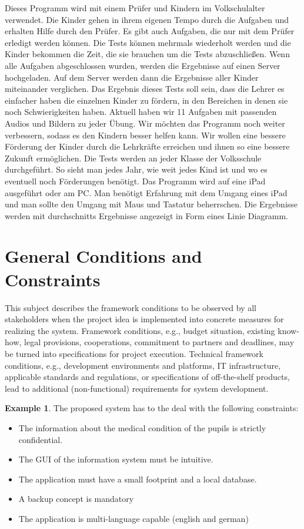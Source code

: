 \documentclass[12pt]{article}
\theoremstyle{definition}
\newtheorem{example}{Example}
\newenvironment{explanation}{%
   \setlength{\parindent}{0pt}
   \itshape
   \color{blue}
}{}
\begin{document}
Dieses Programm wird mit einem Prüfer und Kindern im Volkschulalter verwendet. Die Kinder gehen in ihrem eigenen Tempo durch die Aufgaben und erhalten Hilfe durch den Prüfer. Es gibt auch Aufgaben, die nur mit dem Prüfer erledigt werden können. Die Tests können mehrmals wiederholt werden und die Kinder bekommen die Zeit, die sie brauchen um die Tests abzuschließen. Wenn alle Aufgaben abgeschlossen wurden, werden die Ergebnisse auf einen Server hochgeladen. Auf dem Server werden dann die Ergebnisse aller Kinder miteinander verglichen.
Das Ergebnis dieses Tests soll sein, dass die Lehrer es einfacher haben die einzelnen Kinder zu fördern, in den Bereichen in denen sie noch Schwierigkeiten haben.
Aktuell haben wir 11 Aufgaben mit passenden Audios und Bildern zu jeder Übung.
Wir möchten das Programm noch weiter verbessern, sodass es den Kindern besser helfen kann.
Wir wollen eine bessere Förderung der Kinder durch die Lehrkräfte erreichen und ihnen so eine bessere Zukunft ermöglichen.
Die Tests werden an jeder Klasse der Volksschule durchgeführt. So sieht man jedes Jahr, wie weit jedes Kind ist und wo es eventuell noch Förderungen benötigt.
Das Programm wird auf eine iPad ausgeführt oder am PC. Man benötigt Erfahrung mit dem Umgang eines iPad und man sollte den Umgang mit Maus und Tastatur beherrschen.
Die Ergebnisse werden mit durchschnitts Ergebnisse angezeigt in Form eines Linie Diagramm.


\pagebreak

\section{General Conditions and Constraints}
\begin{explanation}
This subject describes the framework conditions to be observed by all stakeholders when the project idea is implemented into concrete measures for realizing the system. Framework conditions, e.g., budget situation, existing know-how, legal provisions, cooperations, commitment to partners and deadlines, may be turned into specifications for project execution.
Technical framework conditions, e.g., development environments and platforms, IT infrastructure, applicable standards and regulations, or specifications of off-the-shelf products, lead to additional (non-functional) requirements for system development.
\end{explanation}

\begin{example}
The proposed system has to the deal with the following constraints:
\begin{itemize}
\item The information about the medical condition of the pupils is strictly confidential.
\item The GUI of the information system must be intuitive.
\item The application must have a small footprint and a local database.
\item A backup concept is mandatory
\item The application is multi-language capable (english and german)
\end{itemize}
\end{example}
\end{document}
